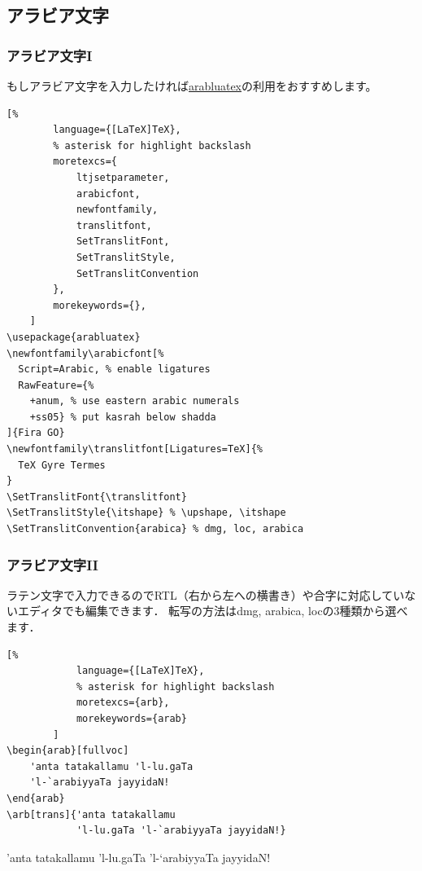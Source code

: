 \documentclass[%
    hyperref={%
        colorlinks,
        linkcolor=sDarkBlue,
        urlcolor=sDarkBlue,
        citecolor=sDarkBlue
    },
    aspectratio=169
]{beamer}
\newcommand{\inlinecommand}[1]{{\ttfamily #1}}
\begin{document}
    \subsection{アラビア文字}
    \begin{frame}[fragile]
    \frametitle{アラビア文字I}
        もしアラビア文字を入力したければ\href{https://ctan.org/pkg/arabluatex?lang=en}{arabluatex}の利用をおすすめします。
    \begin{leftbar}
    \begin{lstlisting}[%
        language={[LaTeX]TeX},
        % asterisk for highlight backslash
        moretexcs={
            ltjsetparameter,
            arabicfont,
            newfontfamily,
            translitfont,
            SetTranslitFont,
            SetTranslitStyle,
            SetTranslitConvention
        },
        morekeywords={},
    ]
\usepackage{arabluatex}
\newfontfamily\arabicfont[%
  Script=Arabic, % enable ligatures
  RawFeature={%
    +anum, % use eastern arabic numerals
    +ss05} % put kasrah below shadda
]{Fira GO}
\newfontfamily\translitfont[Ligatures=TeX]{%
  TeX Gyre Termes
}
\SetTranslitFont{\translitfont}
\SetTranslitStyle{\itshape} % \upshape, \itshape
\SetTranslitConvention{arabica} % dmg, loc, arabica
    \end{lstlisting}
    \end{leftbar}
    \end{frame}

    \begin{frame}[fragile]
        \frametitle{アラビア文字II}
        ラテン文字で入力できるのでRTL（右から左への横書き）や合字に対応していないエディタでも編集できます．
        転写の方法は\inlinecommand{dmg}, \inlinecommand{arabica}, \inlinecommand{loc}の3種類から選べます．

        \begin{leftbar}
        \begin{lstlisting}[%
            language={[LaTeX]TeX},
            % asterisk for highlight backslash
            moretexcs={arb},
            morekeywords={arab}
        ]
\begin{arab}[fullvoc]
    'anta tatakallamu 'l-lu.gaTa
    'l-`arabiyyaTa jayyidaN!
\end{arab}
\arb[trans]{'anta tatakallamu
            'l-lu.gaTa 'l-`arabiyyaTa jayyidaN!}
        \end{lstlisting}
        \end{leftbar}

        \begin{arab}[fullvoc]
            'anta tatakallamu 'l-lu.gaTa 'l-`arabiyyaTa jayyidaN!
        \end{arab}

        \bigskip

    \end{frame}
\end{document}
